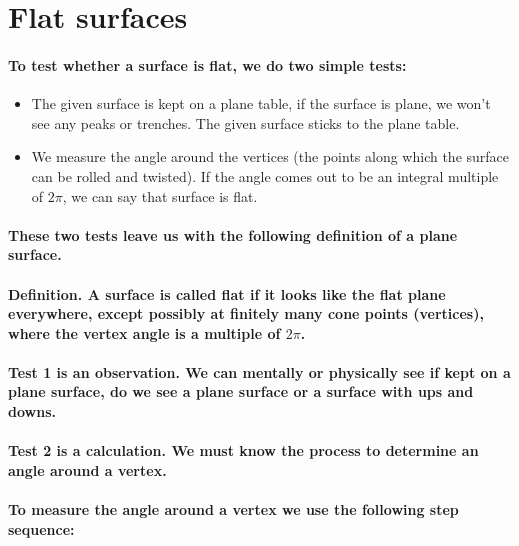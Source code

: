 \documentclass{report}
\begin{document}
\section{Flat surfaces}

\paragraph{To test whether a surface is flat, we do two simple tests:}

\begin{itemize}
\item  {The given surface is kept on a plane table, if the surface is plane, we won’t see any peaks or trenches. The given surface sticks to the plane table.}

\item  { We measure the angle around the vertices (the points along which the surface can be rolled and twisted). If the angle comes out to be an integral multiple of $2\pi$, we can say that surface is flat.}
\end{itemize}

\paragraph{These two tests leave us with the following definition of a plane surface.}



\paragraph{\textbf{Definition.} A surface is called flat if it looks like the flat plane everywhere, except possibly at finitely many cone points (vertices), where the vertex angle is a multiple of $2\pi$.}

\paragraph{Test 1 is an observation. We can mentally or physically see if kept on a plane surface, do we see a plane surface or a surface with ups and downs.}

\paragraph{Test 2 is a calculation. We must know the process to determine an angle around a vertex.}

\paragraph{To measure the angle around a vertex we use the following step sequence:}
\end{document}
